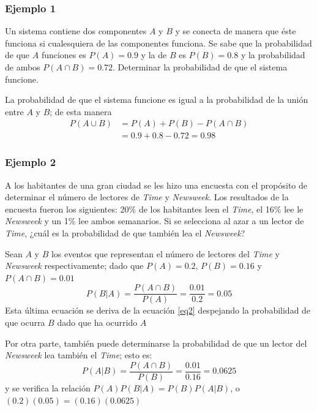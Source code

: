 \documentclass[letterpaper]{article}
\begin{document}
\begin{multicols}{2}
\subsubsection*{Ejemplo 1}
Un sistema contiene dos componentes $A$ y $B$ y se conecta de manera que éste funciona si cualesquiera de las componentes funciona. Se sabe que la probabilidad de que $A$ funciones es $P(A)=0.9$ y la de $B$ es $P(B)=0.8$ y la probabilidad de ambos $P(A\cap B)=0.72$. Determinar la probabilidad de que el sistema funcione.

La probabilidad de que el sistema funcione es igual a la probabilidad de la unión entre $A$ y $B$; de esta manera
\begin{align*}
P(A\cup B)&=P(A)+P(B)-P(A\cap B)\\
&=0.9+0.8-0.72=0.98
\end{align*}
\subsubsection*{Ejemplo 2}
A los habitantes de una gran ciudad se les hizo una encuesta con el propósito de determinar el número de lectores de \textit{Time} y \textit{Newsweek}. Los resultados de la encuesta fueron los siguientes: 20\% de los habitantes leen el \textit{Time}, el 16\% lee le \textit{Newsweek} y un 1\% lee ambos semanarios. Si se selecciona al azar a un lector de \textit{Time}, ¿cuál es la probabilidad de que también lea el \textit{Newsweek}?

Sean $A$ y $B$ los eventos que representan el número de lectores del \textit{Time} y \textit{Newsweek} respectivamente; dado que $P(A)=0.2$, $P(B)=0.16$ y $P(A\cap B)=0.01$
\[P(B|A)=\dfrac{P(A\cap B)}{P(A)}=\dfrac{0.01}{0.2}=0.05\]
Esta última ecuación se deriva de la ecuación \ref{eq2} despejando la probabilidad de que ocurra $B$ dado que ha ocurrido $A$

Por otra parte, también puede determinarse la probabilidad de que un lector del \textit{Newsweek} lea también el \textit{Time}; esto es:
\[P(A|B)=\dfrac{P(A\cap B)}{P(B)}=\dfrac{0.01}{0.16}=0.0625\]
y se verifica la relación $P(A)P(B|A)=P(B)P(A|B)$, o $(0.2)(0.05)=(0.16)(0.0625)$

\end{multicols}
\end{document}
